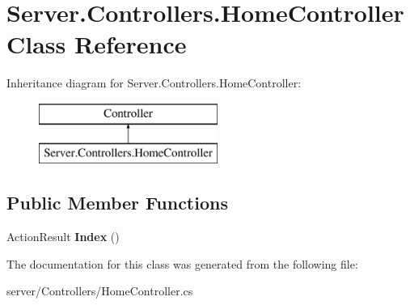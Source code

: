\hypertarget{classServer_1_1Controllers_1_1HomeController}{\section{Server.\-Controllers.\-Home\-Controller Class Reference}
\label{classServer_1_1Controllers_1_1HomeController}
}
Inheritance diagram for Server.\-Controllers.\-Home\-Controller\-:\begin{figure}[H]
\begin{center}
\leavevmode
\includegraphics[height=2.000000cm]{classServer_1_1Controllers_1_1HomeController}
\end{center}
\end{figure}
\subsection*{Public Member Functions}
\begin{DoxyCompactItemize}
\item 
\hypertarget{classServer_1_1Controllers_1_1HomeController_a8c65a76479bf96d7e30952823d1009a2}{Action\-Result {\bfseries Index} ()}\label{classServer_1_1Controllers_1_1HomeController_a8c65a76479bf96d7e30952823d1009a2}

\end{DoxyCompactItemize}


The documentation for this class was generated from the following file\-:\begin{DoxyCompactItemize}
\item 
server/\-Controllers/Home\-Controller.\-cs\end{DoxyCompactItemize}
